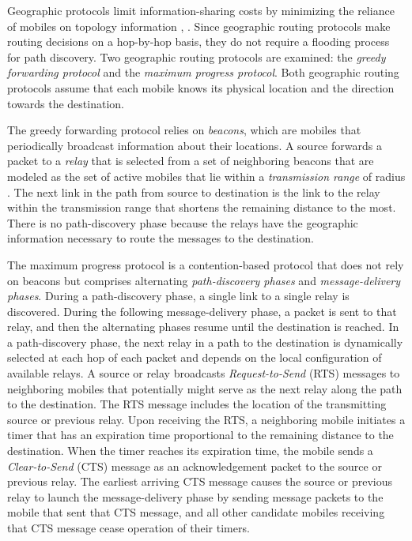 \documentclass[conference]{IEEEtran}
\begin{document}
Geographic protocols limit information-sharing costs
by minimizing the reliance of mobiles on topology
information \cite{cad},
\cite{ghaf}. Since geographic routing protocols
make routing decisions on a hop-by-hop basis, they do
not require a flooding process for path discovery. Two
geographic routing protocols are examined: the
\emph{greedy
forwarding protocol}
and the
\emph{maximum progress protocol}.
Both geographic routing protocols assume that each
mobile knows its physical location and the direction
towards the destination.

The greedy forwarding protocol relies on
\emph{beacons}, which are mobiles that periodically broadcast information about their locations. A source forwards a packet to a
\emph{relay}
that is selected from a set of neighboring
beacons that are modeled as the set of active mobiles that
lie within a
\emph{transmission range}
of radius
. The next
link in the path from source
 to destination
 is the link to the relay within the transmission range
that shortens the remaining distance to
 the most.
There is no path-discovery phase because the relays
have the geographic information necessary to route the
messages to the destination.

The maximum progress protocol is a contention-based
protocol that does not rely on beacons but comprises
alternating
\emph{path-discovery phases}
and
\emph{message-delivery
phases}. During a path-discovery phase, a single link to a
single relay is discovered. During the following message-delivery phase, a packet is sent to that relay, and then
the alternating phases resume until the destination is
reached. In a path-discovery phase, the next relay in a
path to the destination is dynamically selected at each
hop of each packet and depends on the local configuration of available relays. A source or relay broadcasts
\emph{Request-to-Send}
(RTS) messages to neighboring mobiles
that potentially might serve as the next relay along the
path to the destination. The RTS message includes the
location of the transmitting source or previous relay.
Upon receiving the RTS, a neighboring mobile initiates
a timer that has an expiration time proportional to the
remaining distance to the destination. When the timer
reaches its expiration time, the mobile sends a
\emph{Clear-to-Send}
(CTS) message as an acknowledgement packet to
the source or previous relay. The earliest arriving CTS
message causes the source or previous relay to launch
the message-delivery phase by sending message packets
to the mobile that sent that CTS message, and all other
candidate mobiles receiving that CTS message cease
operation of their timers.
\end{document}
